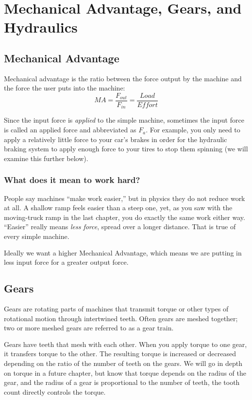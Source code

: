 \chapter{Mechanical Advantage, Gears, and Hydraulics}

\section{Mechanical Advantage}

Mechanical advantage is the ratio between the force output 
by the machine and the force the user puts into the machine:
$$ MA = \frac{F_{out}}{F_{in}} = \frac{Load}{Effort}$$

Since the input force is \textit{applied} to the simple machine, sometimes the 
input force is called an applied force and abbreviated as $F_a$. For example, 
you only need to apply a relatively little force to your car's brakes in order 
for the hydraulic braking system to apply enough force to your tires to stop 
them spinning (we will examine this further below). 

\subsection{What does it mean to work hard?}
People say machines ``make work easier,'' but in physics they do not reduce work at all. A shallow ramp feels easier than a steep one, yet, as you saw with the moving-truck ramp in the last chapter, you do exactly the same work either way. ``Easier'' really means \textit{less force}, spread over a longer distance. That is true of every simple machine.

Ideally we want a higher Mechanical Advantage, which means we are putting in less input force for a greater output force.
\section{Gears}
Gears are rotating parts of machines that transmit torque or other types of rotational motion through intertwined teeth. Often gears are meshed together; two or more meshed gears are referred to as a gear train.

Gears have teeth that mesh with each other. When you apply torque to one gear, 
it transfers torque to the other. The resulting torque is increased or decreased 
depending on the ratio of the number of teeth on the gears. We will go in depth on torque in a future chapter, but know that torque depends on the radius of the gear, and the radius of a gear is proportional to the number of teeth, the tooth count directly controls the torque.

